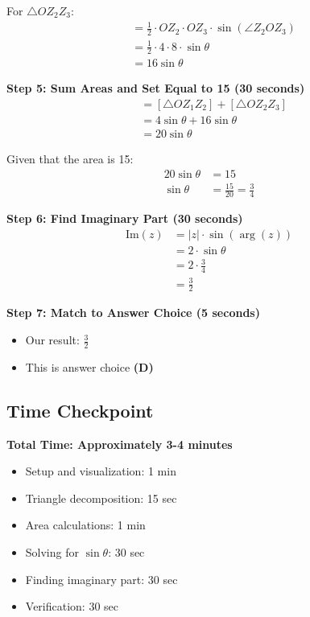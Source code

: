 \documentclass[12pt]{article}
\begin{document}
\begin{solutionbox}
For $\triangle OZ_2Z_3$:
\begin{align*}
[\triangle OZ_2Z_3] &= \frac{1}{2} \cdot OZ_2 \cdot OZ_3 \cdot \sin(\angle Z_2OZ_3) \\
&= \frac{1}{2} \cdot 4 \cdot 8 \cdot \sin\theta \\
&= 16\sin\theta
\end{align*}

\textbf{Step 5: Sum Areas and Set Equal to 15 (30 seconds)}
\begin{align*}
[OZ_1Z_2Z_3] &= [\triangle OZ_1Z_2] + [\triangle OZ_2Z_3] \\
&= 4\sin\theta + 16\sin\theta \\
&= 20\sin\theta
\end{align*}

Given that the area is 15:
\begin{align*}
20\sin\theta &= 15 \\
\sin\theta &= \frac{15}{20} = \frac{3}{4}
\end{align*}

\textbf{Step 6: Find Imaginary Part (30 seconds)}
\begin{align*}
\text{Im}(z) &= |z| \cdot \sin(\arg(z)) \\
&= 2 \cdot \sin\theta \\
&= 2 \cdot \frac{3}{4} \\
&= \frac{3}{2}
\end{align*}

\textbf{Step 7: Match to Answer Choice (5 seconds)}
\begin{itemize}
    \item Our result: $\frac{3}{2}$
    \item This is answer choice \textbf{(D)}
\end{itemize}

\subsection*{Time Checkpoint}

\textbf{Total Time: Approximately 3-4 minutes}
\begin{itemize}
    \item Setup and visualization: 1 min
    \item Triangle decomposition: 15 sec
    \item Area calculations: 1 min
    \item Solving for $\sin\theta$: 30 sec
    \item Finding imaginary part: 30 sec
    \item Verification: 30 sec
\end{itemize}


\end{solutionbox}
\end{document}
